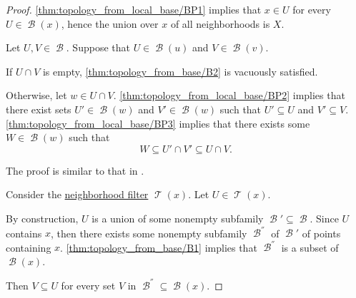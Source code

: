 \begin{proof}

   \ref{thm:topology_from_local_base/BP1} implies that \( x \in U \) for every \( U \in \mscrB(x) \), hence the union over \( x \) of all neighborhoods is \( X \).

   Let \( U, V \in \mscrB \). Suppose that \( U \in \mscrB(u) \) and \( V \in \mscrB(v) \).

  If \( U \cap V \) is empty, \ref{thm:topology_from_base/B2} is vacuously satisfied.

  Otherwise, let \( w \in U \cap V \). \ref{thm:topology_from_local_base/BP2} implies that there exist sets \( U' \in \mscrB(w) \) and \( V' \in \mscrB(w) \) such that \( U' \subseteq U \) and \( V' \subseteq V \). \ref{thm:topology_from_local_base/BP3} implies that there exists some \( W \in \mscrB(w) \) such that
  \begin{equation*}
    W \subseteq U' \cap V' \subseteq U \cap V.
  \end{equation*}

   The proof is similar to that in .

   Consider the \hyperref[def:neighborhood_system]{neighborhood filter} \( \mscrT(x) \). Let \( U \in \mscrT(x) \).

  By construction, \( U \) is a union of some nonempty subfamily \( \mscrB' \subseteq \mscrB \). Since \( U \) contains \( x \), then there exists some nonempty subfamily \( \mscrB^\dprime \) of \( \mscrB' \) of points containing \( x \). \ref{thm:topology_from_base/B1} implies that \( \mscrB^\dprime \) is a subset of \( \mscrB(x) \).

  Then \( V \subseteq U \) for every set \( V \) in \( \mscrB^\dprime \subseteq \mscrB(x) \).
\end{proof}

